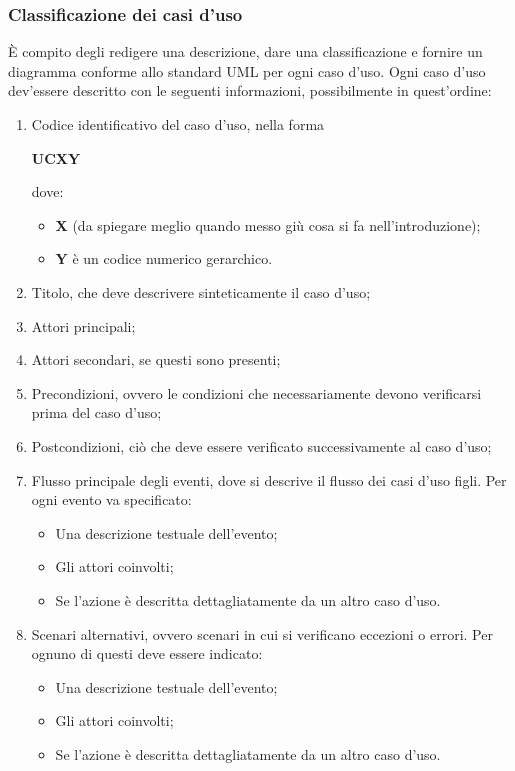 \documentclass[../NormeProgetto.tex]{subfiles}
\begin{document}
		\subsubsection{Classificazione dei casi d'uso}
		È compito degli \analisti redigere una descrizione, dare una classificazione e fornire un diagramma conforme allo standard UML per ogni caso d'uso. Ogni caso d'uso dev'essere descritto con le seguenti informazioni, possibilmente in quest'ordine:
		\begin{enumerate}
			\item Codice identificativo del caso d'uso, nella forma \begin{center}\textbf{UCXY}\end{center} dove:
				\begin{itemize}
					\item \textbf{X} (da spiegare meglio quando messo giù cosa si fa nell'introduzione);
					\item \textbf{Y} è un codice numerico gerarchico.
				\end{itemize}
			\item Titolo, che deve descrivere sinteticamente il caso d'uso;
			\item Attori principali;
			\item Attori secondari, se questi sono presenti;
			\item Precondizioni, ovvero le condizioni che necessariamente devono verificarsi prima del caso d'uso;
			\item Postcondizioni, ciò che deve essere verificato successivamente al caso d'uso;
			\item Flusso principale degli eventi, dove si descrive il flusso dei casi d'uso figli. Per ogni evento va specificato:
				\begin{itemize}
					\item Una descrizione testuale dell'evento;
					\item Gli attori coinvolti;
					\item Se l'azione è descritta dettagliatamente da un altro caso d'uso.
				\end{itemize}
			\item Scenari alternativi, ovvero scenari in cui si verificano eccezioni o errori. Per ognuno di questi deve essere indicato:
				\begin{itemize}
					\item Una descrizione testuale dell'evento;
					\item Gli attori coinvolti;
					\item Se l'azione è descritta dettagliatamente da un altro caso d'uso.
				\end{itemize}
		\end{enumerate}
\end{document}
